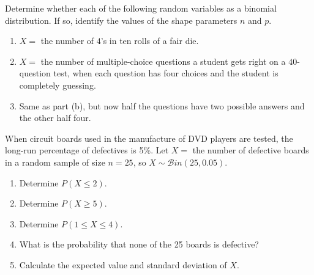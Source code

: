 \documentclass[12pt,reqno]{amsart}
\begin{document}
\bigskip

\prob Determine whether each of the following random variables as a binomial distribution. If so, identify the values of the shape parameters $n$ and $p$.

\medskip
\begin{enumerate}
\item $X=$ the number of $4$'s in ten rolls of a fair die.\vfill



\item $X=$ the number of multiple-choice questions a student gets right on a $40$-question test, when each question has four choices and the student is completely guessing.\vfill



\item Same as part (b), but now half the questions have two possible answers and the other half four.\vfill


\end{enumerate}











\bigskip
\prob When circuit boards used in the manufacture of DVD players are tested, the long-run percentage of defectives is 5\%. Let $X =$ the number of defective boards in a random sample of size $n = 25$, so $X \sim \mathcal{B}in(25, 0.05)$.

\medskip
\begin{enumerate}
\item Determine $P(X\leq 2)$.\vfill



\item Determine $P(X\geq 5)$.\vfill



\item Determine $P(1\leq X \leq 4)$.\vfill



\item What is the probability that none of the 25 boards is defective?\vfill



\item Calculate the expected value and standard deviation of $X$.\vfill


\end{enumerate}
\end{document}
